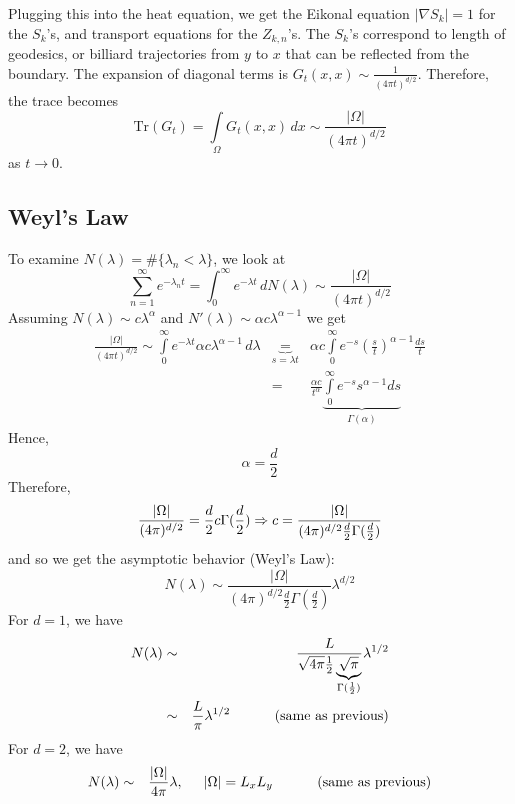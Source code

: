 Plugging this into the heat equation, we get the Eikonal equation $|\nabla S_k|=1$ for the $S_k$'s, and transport equations for the $Z_{k,n}$'s.  The $S_k$'s correspond to length of geodesics, or billiard trajectories from $y$ to $x$ that can be reflected from the boundary. The expansion of diagonal terms is $G_t(x,x)\sim\frac{1}{(4\pi t)^{d/2}}$. Therefore, the trace becomes
\begin{equation*}
\text{Tr}(G_t)=\int\limits_\Omega G_t(x,x)\,dx\sim\frac{|\Omega|}{(4\pi t)^{d/2}}
\end{equation*}
as $t\rightarrow0$.

\subsection{Weyl's Law}
To examine $N(\lambda)=\#\{\lambda_n<\lambda\}$, we look at
\begin{equation*}
\sum_{n=1}^\infty e^{-\lambda_n t} = \int_0^\infty e^{-\lambda t}\, dN(\lambda)\sim \frac{|\Omega|}{(4\pi t)^{d/2}}
\end{equation*}
Assuming $N(\lambda)\sim c \lambda^\alpha$ and $N'(\lambda)\sim\alpha c \lambda^{\alpha-1}$ we get
\begin{eqnarray*}
\frac{|\Omega|}{(4\pi t)^{d/2}}\sim\int\limits_0^\infty e^{-\lambda t}\alpha c \lambda^{\alpha-1}\,d\lambda &\underbrace{=}_\text{$s=\lambda t$}& \alpha c\int\limits_0^\infty e^{-s}\left(\frac{s}{t}\right)^{\alpha-1}\frac{ds}{t}\\
&=&\frac{\alpha c}{t^\alpha}\underbrace{\int\limits_0^\infty e^{-s}s^{\alpha-1}ds}_\text{$\Gamma(\alpha)$}
\end{eqnarray*}
Hence,
$$\alpha=\frac{d}{2}$$
Therefore,
\begin{equation*}
\frac{|\Omega|}{(4\pi)^{d/2}} = \frac{d}{2}c \Gamma(\frac{d}{2}) \Rightarrow c=\frac{|\Omega|}{(4\pi)^{d/2}\frac{d}{2}\Gamma(\frac{d}{2})}\\
\end{equation*}
and so we get the asymptotic behavior (Weyl's Law):
\begin{equation}
N(\lambda)\sim\frac{|\Omega|}{(4\pi)^{d/2}\frac{d}{2}\Gamma(\frac{d}{2})}\lambda^{d/2}
\end{equation}
For $d=1$, we have
\begin{eqnarray*}
N(\lambda)&\sim&\frac{L}{\sqrt{4\pi}\frac{1}{2}\underbrace{\sqrt{\pi}}_\text{$\Gamma(\frac{1}{2})$}} \lambda^{1/2}\\
&\sim&\frac{L}{\pi}\lambda^{1/2} \text{\hspace{1cm} (same as previous)}\\
\end{eqnarray*}
For $d=2$, we have
\begin{eqnarray*}
N(\lambda)&\sim&\frac{|\Omega|}{4\pi}\lambda, \hspace{0.5cm}|\Omega|=L_xL_y \text{\hspace{1cm} (same as previous)}\\
\end{eqnarray*}

